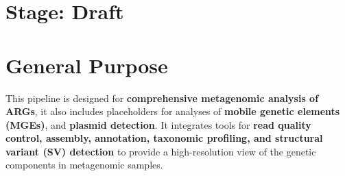 \documentclass[11pt]{article}
\begin{document}
\section*{Stage: Draft}   
\section*{General Purpose}

This pipeline is designed for \textbf{comprehensive metagenomic analysis of ARGs}, it also includes placeholders for analyses of \textbf{mobile genetic elements (MGEs)}, and \textbf{plasmid detection}. It integrates tools for \textbf{read quality control, assembly, annotation, taxonomic profiling, and structural variant (SV) detection} to provide a high-resolution view of the genetic components in metagenomic samples.
\end{document}
